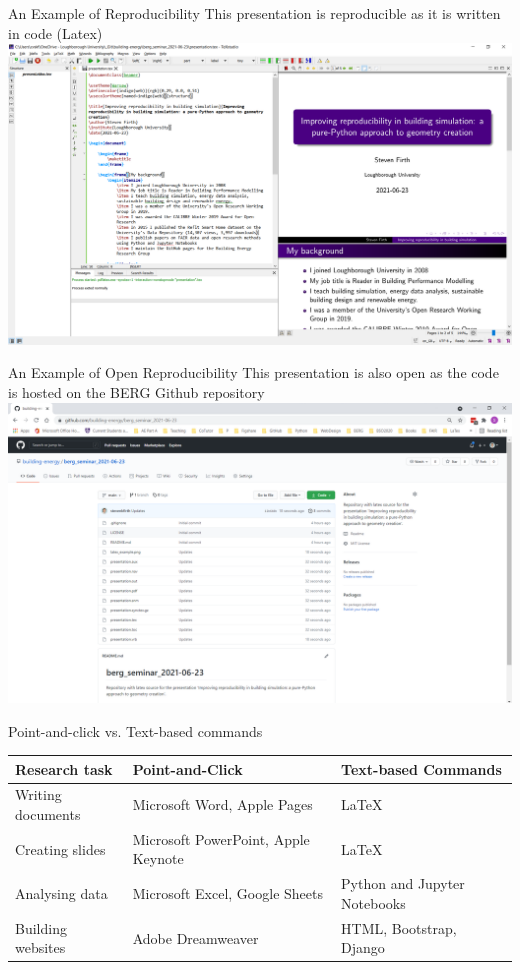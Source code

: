 \documentclass{beamer}
\begin{document}
	\begin{frame}{An Example of Reproducibility}
		This presentation is reproducible as it is written in code (Latex)\\[10pt]
		\includegraphics[width=\textwidth,keepaspectratio]{latex_example.png}
	\end{frame}
	
	\begin{frame}{An Example of Open Reproducibility}
		This presentation is also open as the code is hosted on the BERG Github repository\\[10pt]
		\includegraphics[width=\textwidth,keepaspectratio]{github_example.png}
	\end{frame}

	\begin{frame}{Point-and-click vs. Text-based commands}
		\begin{tabular}{p{}p{}p{}}
			 \toprule
			 Research task & Point-and-Click & Text-based Commands \\
			 \midrule
			 Writing documents & Microsoft Word, Apple Pages & \LaTeX \\
			 Creating slides & Microsoft PowerPoint, Apple Keynote & \LaTeX \\
			 Analysing data & Microsoft Excel, Google Sheets & Python and Jupyter Notebooks \\
			 Building websites & Adobe Dreamweaver & HTML, Bootstrap, Django
		\end{tabular}
	\end{frame}
\end{document}
